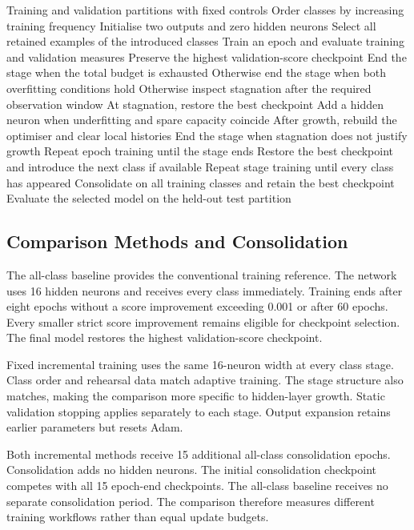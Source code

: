 \documentclass[conference,10pt]{IEEEtran}
\begin{document}
\begin{algorithm}[t]
\caption{Minority-first adaptive class learning}
\label{alg:adaptive}
\begin{algorithmic}[1]
\Require Training and validation partitions with fixed controls
\State Order classes by increasing training frequency
\State Initialise two outputs and zero hidden neurons
\State Select all retained examples of the introduced classes
\State Train an epoch and evaluate training and validation measures
\State Preserve the highest validation-score checkpoint
\State End the stage when the total budget is exhausted
\State Otherwise end the stage when both overfitting conditions hold
\State Otherwise inspect stagnation after the required observation window
\State At stagnation, restore the best checkpoint
\State Add a hidden neuron when underfitting and spare capacity coincide
\State After growth, rebuild the optimiser and clear local histories
\State End the stage when stagnation does not justify growth
\State Repeat epoch training until the stage ends
\State Restore the best checkpoint and introduce the next class if available
\State Repeat stage training until every class has appeared
\State Consolidate on all training classes and retain the best checkpoint
\State Evaluate the selected model on the held-out test partition
\end{algorithmic}
\end{algorithm}

\subsection{Comparison Methods and Consolidation}

The all-class baseline provides the conventional training reference. The network uses 16 hidden neurons and receives every class immediately. Training ends after eight epochs without a score improvement exceeding 0.001 or after 60 epochs. Every smaller strict score improvement remains eligible for checkpoint selection. The final model restores the highest validation-score checkpoint.

Fixed incremental training uses the same 16-neuron width at every class stage. Class order and rehearsal data match adaptive training. The stage structure also matches, making the comparison more specific to hidden-layer growth. Static validation stopping applies separately to each stage. Output expansion retains earlier parameters but resets Adam.

Both incremental methods receive 15 additional all-class consolidation epochs. Consolidation adds no hidden neurons. The initial consolidation checkpoint competes with all 15 epoch-end checkpoints. The all-class baseline receives no separate consolidation period. The comparison therefore measures different training workflows rather than equal update budgets.
\end{document}
